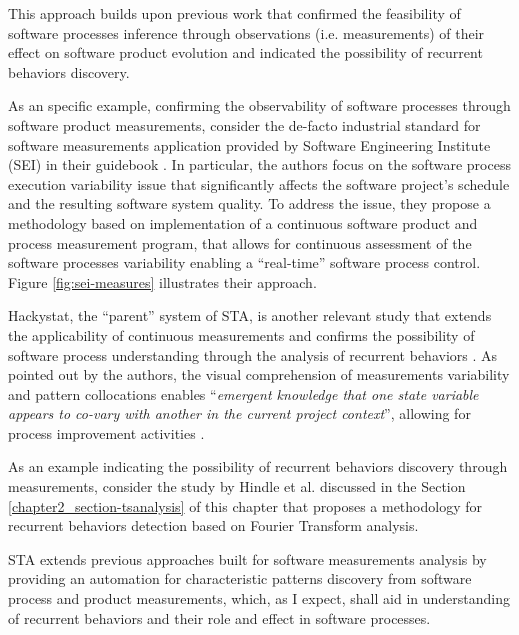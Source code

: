 This approach builds upon previous work that confirmed the feasibility of software processes inference through 
observations (i.e. measurements) of their effect on software product evolution and indicated the possibility of 
recurrent behaviors discovery. 

As an specific example, confirming the observability of software processes through software product measurements, 
consider the de-facto industrial standard for software measurements application provided by 
Software Engineering Institute (SEI) in their guidebook \cite{citeulike:10567306}. 
In particular, the authors focus on the software process execution variability issue that significantly 
affects the software project's schedule and the resulting software system quality. 
To address the issue, they propose a methodology based on implementation of a continuous software product 
and process measurement program, that allows for continuous assessment of the software processes 
variability enabling a ``real-time'' software process control. 
Figure \ref{fig:sei-measures} illustrates their approach.

Hackystat, the ``parent'' system of STA, is another relevant study that extends the applicability of continuous 
measurements and confirms the possibility of software process understanding through the analysis of recurrent 
behaviors \cite{citeulike:557296}. 
As pointed out by the authors, the visual comprehension of measurements variability and pattern collocations enables 
``\textit{emergent knowledge that one state variable appears to co-vary with another in the current project context}'',
allowing for process improvement activities \cite{citeulike:557296}. 

As an example indicating the possibility of recurrent behaviors discovery through measurements, consider the 
study by Hindle et al. \cite{citeulike:10377345} discussed in the Section \ref{chapter2_section-tsanalysis} of 
this chapter that proposes a methodology for recurrent behaviors detection based on Fourier Transform analysis.

STA extends previous approaches built for software measurements analysis by providing an automation for 
characteristic patterns discovery from software process and product measurements, which, as I expect, shall 
aid in understanding of recurrent behaviors and their role and effect in software processes.

